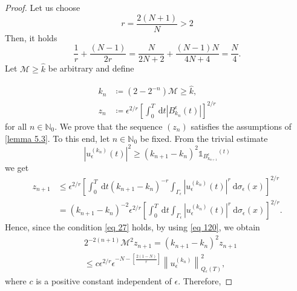 \begin{proof} Let us choose
$$
    r=\frac{2(N+1)}{N}>2
$$
Then, it holds
\begin{equation}
    \frac{1}{r}+\frac{(N-1)}{2 r}=\frac{N}{2N+2}+\frac{(N-1)N}{4N+4}=\frac{N}{4}.
\label{eq 27}
\end{equation}
Let $\mathcal{M} \geq \hat{k}$ be arbitrary and define


\begin{align}
    k_{n} &\coloneqq \left(2-2^{-n}\right) \mathcal{M} \geq \hat{k},  \nonumber \\
    z_{n} &\coloneqq \epsilon^{2 / r}\left[\int_{0}^{T} \mathrm{~d} t\left|B_{k_{n}}^{\epsilon}(t)\right|\right]^{2 / r}
\label{eq 28}
\end{align}
for all $n \in \mathbb{N}_{0}$. We prove that the sequence $\left(z_{n}\right)$ satisfies the assumptions of \eqref{lemma 5.3}. To this end, let $n \in \mathbb{N}_{0}$ be fixed. From the trivial estimate
\begin{equation}
 \left|u_{\epsilon}^{\left(k_{n}\right)}(t)\right|^{2} \geq\left(k_{n+1}-k_{n}\right)^{2} \mathds{1}_{B_{k_{n+1}}^{\epsilon}}{ }^{(t)}
\label{eq 29}\end{equation}
we get
\begin{equation}
    \begin{aligned}
        z_{n+1} & \leq \epsilon^{2 / r}\left[\int_{0}^{T} \mathrm{~d} t\left(k_{n+1}-k_{n}\right)^{-r} \int_{\Gamma_{\epsilon}}\left|u_{\epsilon}^{\left(k_{n}\right)}(t)\right|^{r} \mathrm{~d} \sigma_{\epsilon}(x)\right]^{2 / r} \\
        &=\left(k_{n+1}-k_{n}\right)^{-2} \epsilon^{2 / r}\left[\int_{0}^{T} \mathrm{~d} t \int_{\Gamma_{\epsilon}}\left|u_{\epsilon}^{\left(k_{n}\right)}(t)\right|^{r} \mathrm{~d} \sigma_{\epsilon}(x)\right]^{2 / r}.
    \end{aligned}
\label{eq 30}
\end{equation}
Hence, since the condition \eqref{eq 27} holds, by using \eqref{eq 120}, we obtain
\begin{equation}
    \begin{aligned}
        &2^{-2(n+1)} \mathcal{M}^{2} z_{n+1}=\left(k_{n+1}-k_{n}\right)^{2} z_{n+1} \\
        &\leq c \epsilon^{2 / r} \epsilon^{-N-\left[\frac{2(1-N)}{r}\right]}\left\|u_{\epsilon}^{\left(k_{n}\right)}\right\|_{Q_{\epsilon}(T)}^{2},
    \end{aligned}
\label{eq 31}
\end{equation}
where $c$ is a positive constant independent of $\epsilon$. Therefore,

\end{proof}
